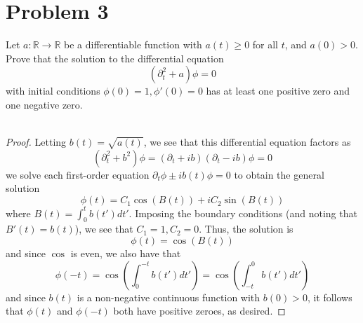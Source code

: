 \documentclass[fontsize=11pt]{scrartcl} %
\numberwithin{equation}{section} %
\numberwithin{figure}{section} %
\numberwithin{table}{section} %
\newcommand{\R}{\mathbb{R}}
\begin{document}
\section*{Problem 3}
Let $a:\R\to\R$ be a differentiable function with $a(t)\geq 0$ for all $t$, and
$a(0)>0$. Prove that the solution to the differential equation
\[
    (\partial_t^2 + a)\phi = 0
\]
with initial conditions $\phi(0)=1,\phi'(0)=0$ has at least one positive zero
and one negative zero.
\\
\\
\begin{proof}
    Letting $b(t) = \sqrt{a(t)}$, we see that this differential equation factors
    as
    \[
        (\partial_t^2 + b^2)\phi = (\partial_t +ib)(\partial_t-ib)\phi=0
    \]
    we solve each first-order equation $\partial_t\phi \pm ib(t)\phi = 0$ to
    obtain the general solution
    \[
        \phi(t) = C_1\cos(B(t)) + iC_2\sin(B(t))
    \]
    where $B(t) = \int_0^tb(t')dt'$. Imposing the boundary conditions (and
    noting that $B'(t)=b(t)$), we see that $C_1 = 1, C_2 =0$. Thus, the solution
    is
    \[
        \phi(t) = \cos(B(t))
    \]
    and since $\cos$ is even, we also have that
    \[
        \phi(-t) = \cos(\int_0^{-t}b(t')dt') = \cos(\int_{-t}^0b(t')dt')
    \]
    and since $b(t)$ is a non-negative continuous function with $b(0)>0$, it
    follows that $\phi(t)$ and $\phi(-t)$ both have positive zeroes, as desired.
\end{proof}

\newpage
\end{document}

